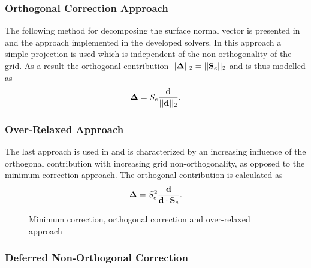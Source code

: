 \subsubsection{Orthogonal Correction Approach}
\label{seq:orthcorrapproach}

The following method for decomposing the surface normal vector is presented in \cite{ferziger02} and the approach implemented in the developed solvers. In this approach a simple projection is used which is independent of the non-orthogonality of the grid. As a result the orthogonal contribution \(||\boldsymbol{\Delta}||_2 =  ||\mathbf{S}_e||_2\) and is thus modelled as 
\begin{displaymath}
  \boldsymbol{\Delta} =  S_e \frac{\mathbf{d}}{ ||\mathbf{d}||_2}.
\end{displaymath}

\subsubsection{Over-Relaxed Approach}

The last approach is used in \cite{jasak96,darwish09} and is characterized by an increasing influence of the orthogonal contribution with increasing grid non-orthogonality, as opposed to the minimum correction approach. The orthogonal contribution is calculated as
\begin{displaymath}
  \boldsymbol{\Delta} =  S_e^2 \frac{\mathbf{d}}{ \mathbf{d} \cdot \mathbf{S}_e }.
\end{displaymath} 

\begin{figure}[h]
\label{fig:nonorth}
\hfil
{}
\hfil
{}
\caption{Minimum correction, orthogonal correction and over-relaxed approach}
\end{figure}

\subsubsection{Deferred Non-Orthogonal Correction}

